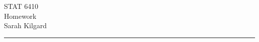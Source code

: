\documentclass[12pt,letterpaper, onecolumn]{exam}
\begin{document}
\begingroup  
    \centering
    \LARGE STAT 6410\\
    \LARGE Homework \\[0.5em]
    \large Sarah Kilgard\par
\endgroup
\rule{\textwidth}{0.4pt}
\pointsdroppedatright   %
\printanswers
\renewcommand{\solutiontitle}{\noindent\textbf{Ans:}\enspace}   %

\begin{questions}
    \question 
    \begin{solution}
        
    \end{solution}

    \question 
    \begin{solution}
        
    \end{solution}

    \question 
    \begin{solution}
        
    \end{solution}

    \question 
    \begin{solution}
        
    \end{solution}

\end{questions}
\end{document}
